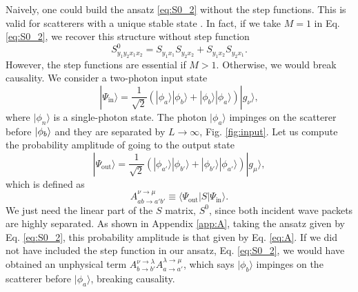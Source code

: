 \documentclass[notitlepage, prx, preprint, amsmath,superscriptaddress,amssymb]{revtex4-1}
\begin{document}
Naively, one could build the ansatz \eqref{eq:S0_2} without the step functions. This is valid for scatterers with a unique stable state \cite{Xu2013}. In fact, if we take $M=1$ in Eq. \eqref{eq:S0_2}, we recover this structure without step function
\begin{equation}\label{eq:S0_2_1}
S^0_{y_1y_2x_1x_2} = S_{y_1x_1}S_{y_2x_2} + S_{y_1x_2}S_{y_2x_1}.
\end{equation}
However, the step functions are essential if $M>1$. Otherwise, we would break causality. We consider a two-photon input state
\begin{equation}\label{eq:input}
|\Psi_\text{in}\rangle = \frac{1}{\sqrt{2}}(|\phi_a\rangle |\phi_b\rangle + |\phi_b\rangle |\phi_a\rangle)|g_\nu\rangle,
\end{equation}
where $|\phi_n\rangle$ is a single-photon state. The photon $|\phi_a\rangle$ impinges on the scatterer before $\ket{\phi_b}$ and they are separated by $L\to\infty$, Fig. \ref{fig:input}. Let us compute the probability amplitude of going to the output state
\begin{equation}\label{eq:output}
|\Psi_\text{out}\rangle = \frac{1}{\sqrt{2}}(|\phi_{a'}\rangle |\phi_{b'}\rangle + |\phi_{b'}\rangle |\phi_{a'}\rangle)|g_\mu\rangle,
\end{equation}
which is defined as
\begin{equation}\label{eq:A_def}
A_{ab\to a'b'}^{\nu\to\mu} \equiv \langle \Psi_\text{out}|S|\Psi_\text{in}\rangle.
\end{equation}
We just need the linear part of the $S$ matrix, $S^0$, since both incident wave packets are highly separated. As shown in Appendix \ref{app:A}, taking the ansatz given by Eq. \eqref{eq:S0_2}, this probability amplitude is that given by Eq. \eqref{eq:A}. If we did not have included the step function in our ansatz, Eq. \eqref{eq:S0_2}, we would have obtained an unphysical term $A_{b\to b'}^{\nu\to\lambda} A_{a\to a'}^{\lambda\to\mu}$, which says $|\phi_b\rangle$ impinges on the scatterer before $|\phi_a\rangle$, breaking causality.%
\end{document}
